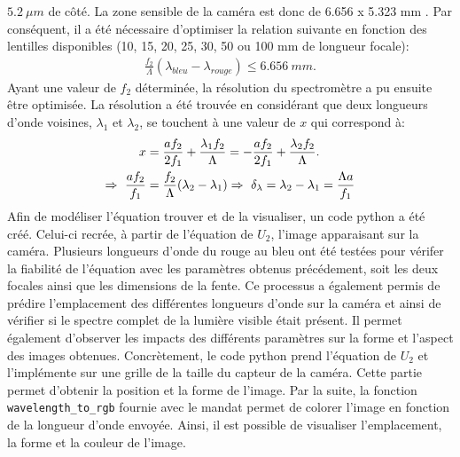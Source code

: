\documentclass[conference]{IEEEtran}
\begin{document}
$5.2\ \mu m$ de côté. La zone sensible de la caméra est donc de 6.656 x 5.323 mm \cite{camera}. Par conséquent, il a été nécessaire d'optimiser la relation suivante
en fonction des lentilles disponibles (10, 15, 20, 25, 30, 50 ou 100 mm de longueur focale):
\begin{align}\label{spectre}
    \frac{f_2}{\Lambda}(\lambda_{bleu}-\lambda_{rouge})\leq 6.656\ mm.
\end{align}
Ayant une valeur de $f_2$ déterminée, la résolution du spectromètre a pu ensuite être optimisée. La résolution a été trouvée en
considérant que deux longueurs d'onde voisines, $\lambda_1$ et $\lambda_2$, se touchent à une valeur de $x$ qui correspond à:
\begin{align}\label{resolution}
    x&=\frac{a f_2}{2f_1}+\frac{\lambda_1 f_2}{\Lambda}=-\frac{a f_2}{2f_1}+\frac{\lambda_2 f_2}{\Lambda}.\notag \\
    \Rightarrow\ \frac{af_2}{f_1}&=\frac{f_2}{\Lambda}(\lambda_2-\lambda_1)\Rightarrow\ \delta_{\lambda}=\lambda_2-\lambda_1=\frac{\Lambda a}{f_1}
\end{align}
Afin de modéliser l'équation trouver et de la visualiser, un code python a été créé. Celui-ci recrée, à partir de l'équation
de $U_2$, l'image apparaisant sur la caméra. Plusieurs longueurs d'onde du rouge au bleu ont été testées pour vérifer 
la fiabilité de l'équation avec les paramètres obtenus précédement, soit les deux focales ainsi que les dimensions de la fente. 
Ce processus a également permis de prédire l'emplacement des différentes longueurs d'onde sur la caméra 
et ainsi de vérifier si le spectre complet de la lumière visible était présent. Il permet également d'observer les
impacts des différents paramètres sur la forme et l'aspect des images obtenues. Concrètement, le code python prend 
l'équation de $U_2$ et l'implémente sur une grille de la taille du capteur de la caméra. Cette partie permet d'obtenir 
la position et la forme de l'image. Par la suite, la fonction \texttt{wavelength\_to\_rgb} fournie avec le mandat permet de colorer l'image en fonction
de la longueur d'onde envoyée. Ainsi, il est possible de visualiser l'emplacement, la forme et la couleur de l'image.    
\end{document}
